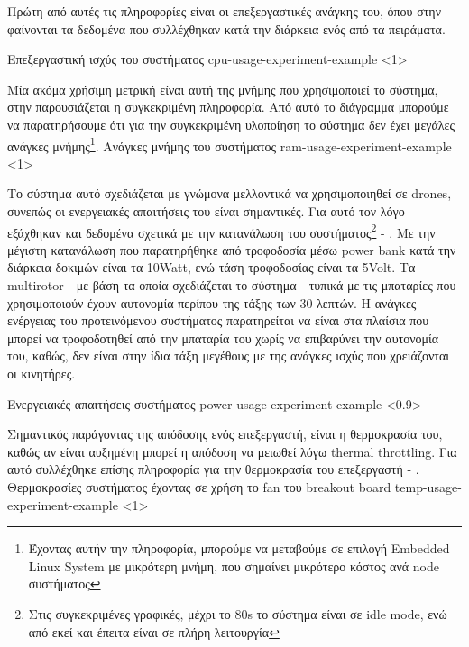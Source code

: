 Πρώτη από αυτές τις πληροφορίες είναι οι επεξεργαστικές ανάγκης του, όπου στην 
φαίνονται τα δεδομένα που συλλέχθηκαν κατά την διάρκεια ενός από τα πειράματα. 

{Επεξεργαστική ισχύς του συστήματος}%
{cpu-usage-experiment-example}%
<1>

Μία ακόμα χρήσιμη μετρική είναι αυτή της μνήμης που χρησιμοποιεί το σύστημα, στην 
παρουσιάζεται η συγκεκριμένη πληροφορία. Από αυτό το διάγραμμα μπορούμε να παρατηρήσουμε ότι για την συγκεκριμένη υλοποίηση το σύστημα δεν έχει μεγάλες ανάγκες μνήμης\footnote{Έχοντας αυτήν την πληροφορία, μπορούμε να μεταβούμε σε επιλογή Embedded Linux System με μικρότερη μνήμη, που σημαίνει μικρότερο κόστος ανά node συστήματος}.
{Ανάγκες μνήμης του συστήματος}%
{ram-usage-experiment-example}%
<1>

Το σύστημα αυτό σχεδιάζεται με γνώμονα μελλοντικά να χρησιμοποιηθεί σε drones, συνεπώς οι ενεργειακές απαιτήσεις του είναι σημαντικές. Για αυτό τον λόγο ε\-ξά\-χθη\-καν και δεδομένα σχετικά με την κατανάλωση του συστήματος\footnote{Στις συγκεκριμένες γραφικές, μέχρι το 80s το σύστημα είναι σε idle mode, ενώ από εκεί και έπειτα είναι σε πλήρη λειτουργία} - . Με την μέγιστη κατανάλωση που παρατηρήθηκε από τροφοδοσία μέσω power bank κατά την διάρκεια δοκιμών είναι τα 10Watt, ενώ τάση τροφοδοσίας είναι τα 5Volt. Τα multirotor - με βάση τα οποία σχεδιάζεται το σύστημα - τυπικά με τις μπαταρίες που χρησιμοποιούν έχουν αυτονομία περίπου της τάξης των 30 λεπτών. Η ανάγκες ενέργειας του προτεινόμενου συστήματος παρατηρείται να είναι στα πλαίσια που μπορεί να τροφοδοτηθεί από την μπαταρία του  χωρίς να επιβαρύνει την αυτονομία του, καθώς, δεν είναι στην ίδια τάξη μεγέθους με της ανάγκες ισχύς που χρειάζονται οι κινητήρες.

{Ενεργειακές απαιτήσεις συστήματος}%
{power-usage-experiment-example}%
<0.9>

Σημαντικός παράγοντας της απόδοσης ενός επεξεργαστή, είναι η θερμοκρασία του, καθώς αν είναι αυξημένη μπορεί η απόδοση να μειωθεί λόγω thermal throttling. Για αυτό συλλέχθηκε επίσης πληροφορία για την θερμοκρασία του επεξεργαστή - . 
{Θερμοκρασίες συστήματος έχοντας σε χρήση το fan του breakout board}%
{temp-usage-experiment-example}%
<1>

